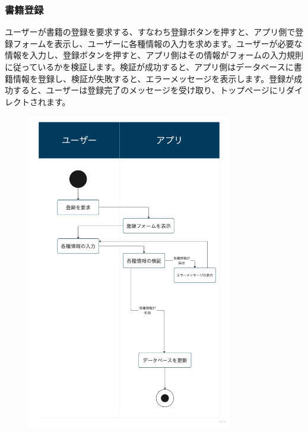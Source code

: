 \documentclass[a4paper, 11pt, titlepage]{jsarticle}
\begin{document}
\clearpage
\subsubsection{書籍登録}

ユーザーが書籍の登録を要求する、すなわち登録ボタンを押すと、アプリ側で登録フォームを表示し、ユーザーに各種情報の入力を求めます。ユーザーが必要な情報を入力し、登録ボタンを押すと、アプリ側はその情報がフォームの入力規則に従っているかを検証します。検証が成功すると、アプリ側はデータベースに書籍情報を登録し、検証が失敗すると、エラーメッセージを表示します。登録が成功すると、ユーザーは登録完了のメッセージを受け取り、トップページにリダイレクトされます。
\begin{figure}[h]
\centering
\includegraphics[width=90mm]{flow-touroku.jpg}
\label{fig:func}
\end{figure}

\clearpage
\end{document}
